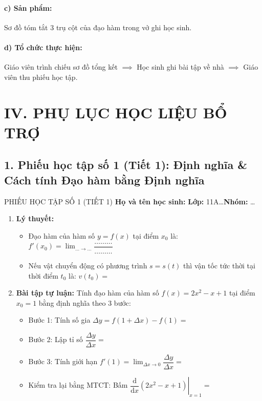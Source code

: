 \documentclass[12pt, a4paper]{article}
\begin{document}
\paragraph{c) Sản phẩm:} Sơ đồ tóm tắt 3 trụ cột của đạo hàm trong vở ghi học sinh.

\paragraph{d) Tổ chức thực hiện:} Giáo viên trình chiếu sơ đồ tổng kết $\implies$ Học sinh ghi bài tập về nhà $\implies$ Giáo viên thu phiếu học tập.

\section*{IV. PHỤ LỤC HỌC LIỆU BỔ TRỢ}

\subsection*{1. Phiếu học tập số 1 (Tiết 1): Định nghĩa & Cách tính Đạo hàm bằng Định nghĩa}

\begin{pedabox}{PHIẾU HỌC TẬP SỐ 1 (TIẾT 1)}
\textbf{Họ và tên học sinh:} \dotfill \textbf{Lớp:} 11A\dots \quad \textbf{Nhóm:} \dots
\begin{enumerate}[leftmargin=0.6cm]
    \item \textbf{Lý thuyết:}
    \begin{itemize}
        \item Đạo hàm của hàm số $y = f(x)$ tại điểm $x_0$ là: $f'(x_0) = \lim_{\dots \to \dots} \dfrac{\dots\dots\dots}{\dots\dots\dots}$
        \item Nếu vật chuyển động có phương trình $s = s(t)$ thì vận tốc tức thời tại thời điểm $t_0$ là: $v(t_0) = $ \dotfill
    \end{itemize}

    \item \textbf{Bài tập tự luận:}
    Tính đạo hàm của hàm số $f(x) = 2x^2 - x + 1$ tại điểm $x_0 = 1$ bằng định nghĩa theo 3 bước:
    \begin{itemize}
        \item Bước 1: Tính số gia $\Delta y = f(1 + \Delta x) - f(1) = $ \dotfill
        \item Bước 2: Lập tỉ số $\dfrac{\Delta y}{\Delta x} = $ \dotfill
        \item Bước 3: Tính giới hạn $f'(1) = \lim_{\Delta x \to 0} \dfrac{\Delta y}{\Delta x} = $ \dotfill
        \item Kiểm tra lại bằng MTCT: Bấm $\left. \dfrac{\mathrm{d}}{\mathrm{d}x} (2x^2 - x + 1) \right|_{x = 1} = $ \dotfill
    \end{itemize}
\end{enumerate}
\end{pedabox}
\end{document}
